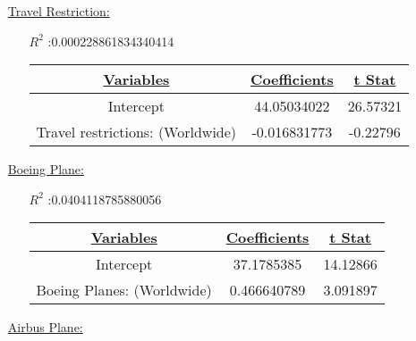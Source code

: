 \documentclass[12pt]{report}
\begin{document}
\begin{enumerate}

 \setlength{\itemsep}{1.5cm}

    \item[\underline{Travel Restriction:}]
        \begin{enumerate}
            \item[$R^2$]:0.000228861834340414
            \item[]
                \begin{tabular}{|c|c|c|}
                    \toprule
                    \hline
                    \underline{Variables} & \underline{Coefficients} & \underline{t Stat}\\ \hline
                    Intercept & 44.05034022 & 26.57321 \\ \hline
                    Travel restrictions: (Worldwide) & -0.016831773 & -0.22796 \\ \hline
                    \bottomrule
                \end{tabular}




        \end{enumerate}

    \item[\underline{Boeing Plane:}]
        \begin{enumerate}
            \item[$R^2$]:0.0404118785880056
            \item[]
                \begin{tabular}{|c|c|c|}
                    \toprule
                  \hline
                    \underline{Variables} & \underline{Coefficients} & \underline{t Stat}\\ \hline
                    Intercept & 37.1785385 & 14.12866 \\ \hline
                    Boeing Planes: (Worldwide) & 0.466640789 & 3.091897 \\ \hline
                    \bottomrule
                \end{tabular}




        \end{enumerate}

    \item[\underline{Airbus Plane:}]
 \begin{samepage}


\end{samepage}
\end{enumerate}
\end{document}
